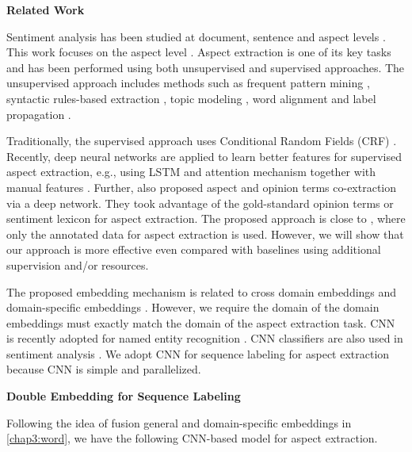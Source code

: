 \textbf{Related Work}

Sentiment analysis has been studied at document, sentence and aspect levels \cite{Liu2012,Pang2008OMS,Cambria2012}. This work focuses on the aspect level \cite{HuL2004}. Aspect extraction is one of its key tasks and has been performed using both unsupervised and supervised approaches. 
The unsupervised approach includes methods such as frequent pattern mining \cite{HuL2004,PopescuNE2005}, syntactic rules-based extraction \cite{ZhuangJZ2006,WangBo2008,QiuLBC2011}, topic modeling \cite{MeiLWSZ2007,TitovM2008,Lin2009,Moghaddam2011}, word alignment \cite{KangLiu2013IJCAI} and label propagation \cite{Zhou-wan-xiao:2013:EMNLP,shu2016lifelong}.

Traditionally, the supervised approach \cite{Jakob2010,Mitchell-EtAl:2013:EMNLP,shu2017lifelong} uses Conditional Random Fields (CRF) \cite{Lafferty2001conditional}.
Recently, deep neural networks are applied to learn better features for supervised aspect extraction, e.g., using
LSTM \cite{williams1989learning,hochreiter1997long,liu2015fine} and
attention mechanism \cite{wang2017coupled,he2017unsupervised} together with manual features \cite{poria2016aspect,wang2016recursive}.
Further, \cite{wang2016recursive,wang2017coupled,li2017deep} also proposed aspect and opinion terms co-extraction via a deep network.
They took advantage of the gold-standard opinion terms or sentiment lexicon for aspect extraction.
The proposed approach is close to \cite{liu2015fine}, where only the annotated data for aspect extraction is used. 
However, we will show that our approach is more effective even compared with baselines using additional supervision and/or resources.

The proposed embedding mechanism is related to cross domain embeddings \cite{bollegala2015unsupervised,bollegala2017think} and domain-specific embeddings \cite{xumeta,Xu2018pro}. 
However, we require the domain of the domain embeddings must exactly match the domain of the aspect extraction task. 
CNN \cite{lecun1995convolutional,kim2014convolutional} is recently adopted for named entity recognition \cite{strubell2017fast}.
CNN classifiers are also used in sentiment analysis \cite{poria2016aspect,chen2017improving}.
We adopt CNN for sequence labeling for aspect extraction because CNN is simple and parallelized.

\textbf{Double Embedding for Sequence Labeling}

Following the idea of fusion general and domain-specific embeddings in \ref{chap3:word}, we have the following CNN-based model for aspect extraction.

